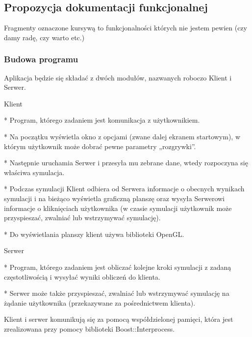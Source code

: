 \subsection*{Propozycja dokumentacji funkcjonalnej}

Fragmenty oznaczone kursywą to funkcjonalności których nie jestem pewien (czy damy radę, czy warto etc.)

\subsubsection*{Budowa programu}

Aplikacja będzie się składać z dwóch modułów, nazwanych roboczo Klient i Serwer.


\begin{DoxyItemize}
\item Klient \begin{DoxyVerb}  * Program, którego zadaniem jest komunikacja z użytkownikiem. 

  * Na początku wyświetla okno z opcjami (zwane dalej ekranem startowym), w którym użytkownik może dobrać pewne parametry „rozgrywki”. 

  * Następnie uruchamia Serwer i przesyła mu zebrane dane, wtedy rozpoczyna się właściwa symulacja. 

  * Podczas symulacji Klient odbiera od Serwera informacje o obecnych wynikach symulacji i na bieżąco wyświetla graficzną planszę oraz wysyła Serwerowi informacje o kliknięciach użytkownika (w czasie symulacji użytkownik może przyspieszać, zwalniać lub wstrzymywać symulację). 

  * Do wyświetlania planszy klient używa biblioteki OpenGL. 
\end{DoxyVerb}

\end{DoxyItemize}


\begin{DoxyItemize}
\item Serwer \begin{DoxyVerb}  * Program, którego zadaniem jest obliczać kolejne kroki symulacji z zadaną częstotliwością i wysyłać wyniki obliczeń do klienta.

  * Serwer może także przyspieszać, zwalniać lub wstrzymywać symulację na żądanie użytkownika (przekazywane za pośrednictwem klienta).
\end{DoxyVerb}

\end{DoxyItemize}

Klient i serwer komunikują się za pomocą współdzielonej pamięci, która jest zrealizowana przy pomocy biblioteki Boost\-::\-Interprocess.

